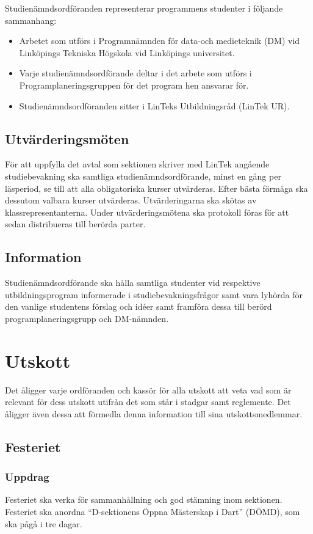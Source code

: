 \documentclass{datateknologsektionen-document}
\begin{document}
Studienämndsordföranden representerar programmens studenter i följande sammanhang:
\begin{itemize}
  \item Arbetet som utförs i Programnämnden för data-och medieteknik (DM) vid Linköpings Tekniska Högskola vid Linköpings universitet.
  \item Varje studienämndsordförande deltar i det arbete som utförs i Programplaneringsgruppen för det program hen ansvarar för.
  \item Studienämndsordföranden sitter i LinTeks Utbildningsråd (LinTek UR).
\end{itemize}
\subsection{Utvärderingsmöten}
\label{utvarderingsmoten}
För att uppfylla det avtal som sektionen skriver med LinTek angående studiebevakning ska
samtliga studienämndsordförande, minst en gång per läsperiod, se till att alla obligatoriska kurser
utvärderas. Efter bästa förmåga ska dessutom valbara kurser utvärderas. Utvärderingarna ska
skötas av klassrepresentanterna. Under utvärderingsmötena ska protokoll föras för att sedan
distribueras till berörda parter.
\subsection{Information}
Studienämndsordförande ska hålla samtliga studenter vid respektive utbildningsprogram
informerade i studiebevakningsfrågor samt vara lyhörda för den vanlige studentens förslag och
idéer samt framföra dessa till berörd programplaneringsgrupp och DM-nämnden.

\section{Utskott}
Det åligger varje ordföranden och kassör för alla utskott att veta vad som är relevant för dess
utskott utifrån det som står i stadgar samt reglemente. Det åligger även dessa att förmedla denna
information till sina utskottsmedlemmar.

\subsection{Festeriet}
\label{festeriet}
\subsubsection{Uppdrag}
Festeriet ska verka för sammanhållning och god stämning inom sektionen. Festeriet ska
anordna ``D-sektionens Öppna Mästerskap i Dart'' (DÖMD), som ska pågå i tre dagar.
\end{document}
